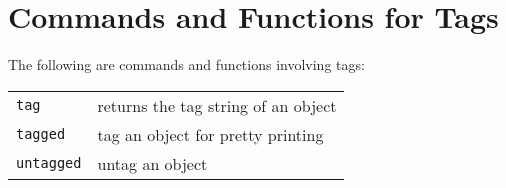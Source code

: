 \documentclass[a4paper]{mybook}
\begin{document}
\section{Commands and Functions for Tags}
\label{Commands and Functions for Tags}

        
The following are commands and functions involving tags:

\begin{center}
\begin{longtable}{ll}
   
{\verb~tag~} &
      returns the tag string of an object\\
   
{\verb~tagged~} &
      tag an object for pretty printing\\
   
{\verb~untagged~} &
      untag an object\\
   
\end{longtable}
\end{center}

\noindent
\end{document}
